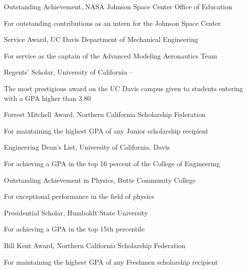 \documentclass[letterpaper,MMMyyyy,nonstop]{simpleresumecv}
\begin{document}
\begin{body}
\BulletItem
Outstanding Achievement,
NASA Johnson Space Center Office of Education
\hfill
{}
\begin{detail}
\SubItem
For outstanding contributions as an intern for the Johnson Space Center
\end{detail}

\Gap
\BulletItem
Service Award,
UC Davis Department of Mechanical Engineering
\hfill
{}
\begin{detail}
\SubItem
For service as the captain of the Advanced Modeling Aeronautics Team
\end{detail}

\Gap
\BulletItem
Regents' Scholar,
University of California
\hfill
{} --
\begin{detail}
\SubItem
The most prestigious award on the UC Davis campus given to students entering with a GPA higher than 3.80
\end{detail}

\Gap
\BulletItem
Forrest Mitchell Award,
Northern California Scholarship Federation
\hfill
{}
\begin{detail}
\SubItem
For maintaining the highest GPA of any Junior scholarship recipient
\end{detail}

\Gap
\BulletItem
Engineering Dean's List,
University of California, Davis
\hfill
{}
\begin{detail}
\SubItem
For achieving a GPA in the top 16 percent of the College of Engineering
\end{detail}

\Gap
\BulletItem
Outstanding Achievement in Physics,
Butte Community College
\hfill
{}
\begin{detail}
\SubItem
For exceptional performance in the field of physics
\end{detail}

\Gap
\BulletItem
Presidential Scholar,
Humboldt State University
\hfill
{}
\begin{detail}
\SubItem
For achieving a GPA in the top 15th percentile
\end{detail}

\Gap
\BulletItem
Bill Kent Award,
Northern California Scholarship Federation
\hfill
{}
\begin{detail}
\SubItem
For maintaining the highest GPA of any Freshmen scholarship recipient
\end{detail}



\end{body}
\end{document}
